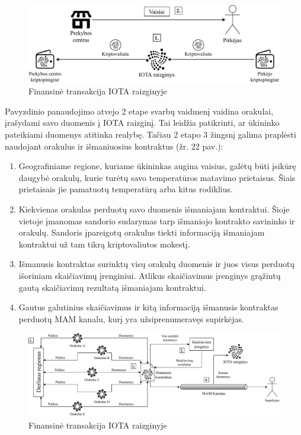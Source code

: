 \begin{figure}[H]
    \centering
    \includegraphics[scale=0.75]{images/tangle-financial-transaction}
    \caption{Finansinė transakcija IOTA raizginyje}
\end{figure}

Pavyzdinio panaudojimo atvejo 2 etape svarbų vaidmenį vaidina orakulai, įrašydami savo duomenis į IOTA raizginį. Tai leidžia patikrinti, ar ūkininko pateikiami duomenys atitinka realybę. Tačiau 2 etapo 3 žingsnį galima praplėsti naudojant orakulus ir išmaniuosius kontraktus (žr. 22 pav.): 
\begin{enumerate}
    \item Geografiniame regione, kuriame ūkininkas augina vaisius, galėtų būti įsikūrę daugybė orakulų, kurie turėtų savo temperatūros matavimo prietaisus. Šiais prietaisais jie pamatuotų temperatūrą arba kitus rodiklius.
    \item Kiekvienas orakulas perduotų savo duomenis išmaniajam kontraktui. Šioje vietoje įmanomas sandorio sudarymas tarp išmaniojo kontrakto savininko ir orakulų. Sandoris įpareigotų orakulus tiekti informaciją išmaniajam kontraktui už tam tikrą kriptovaliutos mokestį.
    \item Išmanusis kontraktas surinktų visų orakulų duomenis ir juos visus perduotų išoriniam skaičiavimų įrenginiui. Atlikus skaičiavimus įrenginys grąžintų gautą skaičiavimų rezultatą išmaniajam kontraktui.
    \item Gautus galutinius skaičiavimus ir kitą informaciją išmanusis kontraktas perduotų MAM kanalu, kurį yra užsiprenumeravęs supirkėjas.
\end{enumerate}

\begin{figure}[H]
    \centering
    \includegraphics[scale=0.63]{images/tangle-smart-contract}
    \caption{Finansinė transakcija IOTA raizginyje}
\end{figure}



